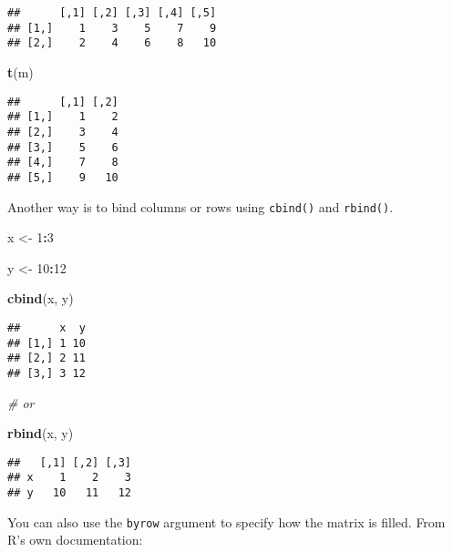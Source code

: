 \documentclass[
]{book}
\newenvironment{Shaded}{\begin{snugshade}}{\end{snugshade}}
\newcommand{\CommentTok}[1]{\textcolor[rgb]{0.56,0.35,0.01}{\textit{#1}}}
\newcommand{\DecValTok}[1]{\textcolor[rgb]{0.00,0.00,0.81}{#1}}
\newcommand{\KeywordTok}[1]{\textcolor[rgb]{0.13,0.29,0.53}{\textbf{#1}}}
\newcommand{\NormalTok}[1]{#1}
\newcommand{\OperatorTok}[1]{\textcolor[rgb]{0.81,0.36,0.00}{\textbf{#1}}}
\newcommand{\StringTok}[1]{\textcolor[rgb]{0.31,0.60,0.02}{#1}}
\begin{document}
\begin{verbatim}
##      [,1] [,2] [,3] [,4] [,5]
## [1,]    1    3    5    7    9
## [2,]    2    4    6    8   10
\end{verbatim}

\begin{Shaded}
\begin{Highlighting}[]
\KeywordTok{t}\NormalTok{(m)}
\end{Highlighting}
\end{Shaded}

\begin{verbatim}
##      [,1] [,2]
## [1,]    1    2
## [2,]    3    4
## [3,]    5    6
## [4,]    7    8
## [5,]    9   10
\end{verbatim}

Another way is to bind columns or rows using \texttt{cbind()} and \texttt{rbind()}.

\begin{Shaded}
\begin{Highlighting}[]
\NormalTok{x \textless{}{-}}\StringTok{ }\DecValTok{1}\OperatorTok{:}\DecValTok{3}

\NormalTok{y \textless{}{-}}\StringTok{ }\DecValTok{10}\OperatorTok{:}\DecValTok{12}

\KeywordTok{cbind}\NormalTok{(x, y)}
\end{Highlighting}
\end{Shaded}

\begin{verbatim}
##      x  y
## [1,] 1 10
## [2,] 2 11
## [3,] 3 12
\end{verbatim}

\begin{Shaded}
\begin{Highlighting}[]
\CommentTok{\# or}

\KeywordTok{rbind}\NormalTok{(x, y)}
\end{Highlighting}
\end{Shaded}

\begin{verbatim}
##   [,1] [,2] [,3]
## x    1    2    3
## y   10   11   12
\end{verbatim}

You can also use the \texttt{byrow} argument to specify how the matrix is filled. From R's own documentation:
\end{document}

